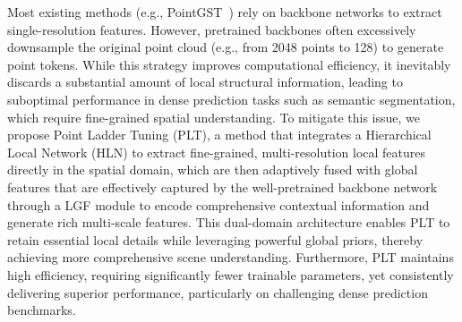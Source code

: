 Most existing methods (e.g., PointGST~\cite{liang2024parameter}) rely on backbone networks to extract single-resolution features. However, pretrained backbones often excessively downsample the original point cloud (e.g., from 2048 points to 128) to generate point tokens. While this strategy improves computational efficiency, it inevitably discards a substantial amount of local structural information, leading to suboptimal performance in dense prediction tasks such as semantic segmentation, which require fine-grained spatial understanding. To mitigate this issue, we propose Point Ladder Tuning (PLT), a method that integrates a Hierarchical Local Network (HLN) to extract fine-grained, multi-resolution local features directly in the spatial domain, which are then adaptively fused with global features that are effectively captured by the well-pretrained backbone network through a LGF module to encode comprehensive contextual information and generate rich multi-scale features. This dual-domain architecture enables PLT to retain essential local details while leveraging powerful global priors, thereby achieving more comprehensive scene understanding. Furthermore, PLT maintains high efficiency, requiring significantly fewer trainable parameters, yet consistently delivering superior performance, particularly on challenging dense prediction benchmarks. 
